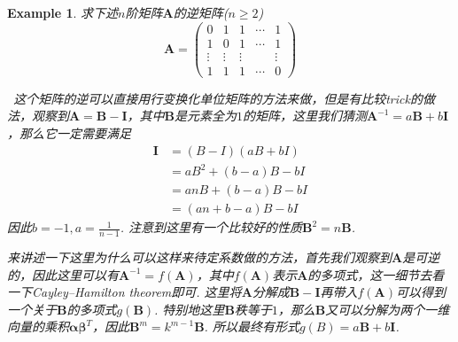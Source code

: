 \documentclass{article}
\newtheorem{example}[theorem]{Example}
\newcommand{\hints}{{\color{blue} \text{hints}}}
\newcommand{\mbf}[1]{\bm{#1}}
\begin{document}
\begin{example}
\rm 求下述$n$阶矩阵$\mbf{A}$的逆矩阵($n \geq 2$)
$$
\mbf{A} =
\begin{pmatrix}
0 & 1 & 1 & \cdots & 1 \\
1 & 0 & 1 & \cdots & 1 \\
\vdots & \vdots & \vdots &  & \vdots \\
1 & 1 & 1 & \cdots & 0
\end{pmatrix}
$$

\hints\ 这个矩阵的逆可以直接用行变换化单位矩阵的方法来做，但是有比较trick的做法，观察到$\mbf{A} = \mbf{B}-\mbf{I}$，其中$\mbf{B}$是元素全为$1$的矩阵，这里我们猜测$\mbf{A}^{-1} = a\mbf{B} + b\mbf{I}$，那么它一定需要满足
$$
\begin{array}{ll}
\mbf{I}  &= (B-I)(aB + bI) \\
  &= aB^2+(b-a)B -bI \\
  &= anB + (b-a)B - bI \\
  &= (an+b-a)B - bI
\end{array}
$$
因此$b=-1,a = \frac{1}{n-1}$. 注意到这里有一个比较好的性质$\mbf{B}^2 = n\mbf{B}$.

来讲述一下这里为什么可以这样来待定系数做的方法，首先我们观察到$\mbf{A}$是可逆的，因此这里可以有$\mbf{A}^{-1} = f(\mbf{A})$，其中$f(\mbf{A})$表示$\mbf{A}$的多项式，这一细节去看一下Cayley–Hamilton theorem即可. 这里将$\mbf{A}$分解成$\mbf{B} - \mbf{I}$再带入$f(\mbf{A})$可以得到一个关于$\mbf{B}$的多项式$g(\mbf{B})$. 特别地这里$\mbf{B}$秩等于$1$，那么$\mbf{B}$又可以分解为两个一维向量的乘积$\mbf{\alpha} \mbf{\beta}^T$，因此$\mbf{B}^m = k^{m-1}\mbf{B}$. 所以最终有形式$g(B) = a\mbf{B} + b\mbf{I}$. 
\end{example}
\end{document}
